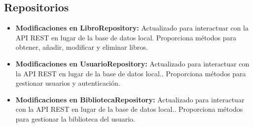 \documentclass[a4paper,11pt]{report}
\begin{document}
      \subsection{Repositorios}
        \begin{itemize}
          \item \textbf{Modificaciones en LibroRepository:} Actualizado para interactuar con la API REST en lugar de la base de datos local. Proporciona métodos para obtener, añadir, modificar y eliminar libros.
          \item \textbf{Modificaciones en UsuarioRepository:} Actualizado para interactuar con la API REST en lugar de la base de datos local.. Proporciona métodos para gestionar usuarios y autenticación.
          \item \textbf{Modificaciones en BibliotecaRepository:} Actualizado para interactuar con la API REST en lugar de la base de datos local.. Proporciona métodos para gestionar la biblioteca del usuario.
        \end{itemize}
\end{document}
